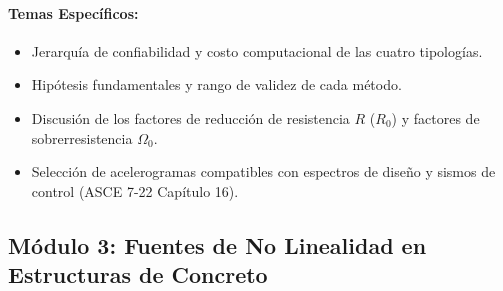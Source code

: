 \documentclass[11pt,letterpaper]{article}
\begin{document}
\begin{modulebox}
\paragraph{Temas Específicos:}
\begin{itemize}
    \item Jerarquía de confiabilidad y costo computacional de las cuatro tipologías.
    \item Hipótesis fundamentales y rango de validez de cada método.
    \item Discusión de los factores de reducción de resistencia $R$ ($R_0$) y factores de sobrerresistencia $\Omega_0$.
    \item Selección de acelerogramas compatibles con espectros de diseño y sismos de control (ASCE 7-22 Capítulo 16).
\end{itemize}
\end{modulebox}

\subsection{Módulo 3: Fuentes de No Linealidad en Estructuras de Concreto}
\end{document}
